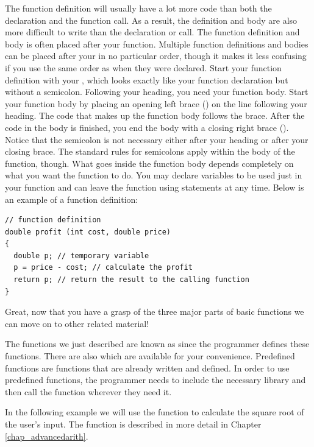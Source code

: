 The function definition will usually have a lot more code than both the declaration and the function call.
As a result, the definition and body are also more difficult to write than the declaration or call. 
The function definition and body is often placed after your  function. 
Multiple function definitions and bodies can be placed after your  in no particular order, though it makes it less confusing if you use the same order as when they were declared.  
Start your function definition with your , which looks exactly like your function declaration but without a semicolon. 
Following your heading, you need your function body. 
Start your function body by placing an opening left brace (\Code{\{}) on the line following your heading. 
The code that makes up the function body follows the brace.
After the code in the body is finished, you end the body with a closing right brace (\Code{\}}). 
Notice that the semicolon is not necessary either after your heading or after your closing brace. 
The standard rules for semicolons apply within the body of the function, though.  
What goes inside the function body depends completely on what you want the function to do. 
You may declare variables to be used just in your function and can leave the function using  statements at any time. 
Below is an example of a function definition:

\noindent\begin{minipage}{\linewidth}\begin{lstlisting} 
// function definition
double profit (int cost, double price) 
{
  double p; // temporary variable
  p = price - cost; // calculate the profit
  return p; // return the result to the calling function
}
\end{lstlisting}\end{minipage}
 
Great, now that you have a grasp of the three major parts of basic functions we can move on to other related material!
 
The functions we just described are known as  since the programmer defines these functions. 
There are also  which are available for your convenience. 
Predefined functions are functions that are already written and defined. 
In order to use predefined functions, the programmer needs to include the necessary library and then call the function wherever they need it.

In the following example we will use the  function to calculate the square root of the user's input. The  function is described in more detail in Chapter \ref{chap_advancedarith}.
 
